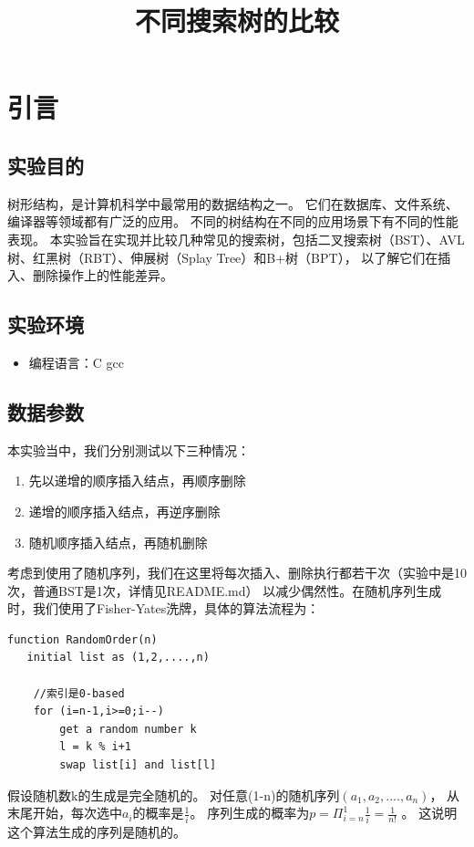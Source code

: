 \documentclass[openany]{book}
\title{不同搜索树的比较}
\begin{document}
\maketitle

\chapter{引言}
\section{实验目的}
树形结构，是计算机科学中最常用的数据结构之一。
它们在数据库、文件系统、编译器等领域都有广泛的应用。
不同的树结构在不同的应用场景下有不同的性能表现。
本实验旨在实现并比较几种常见的搜索树，包括二叉搜索树（BST）、AVL树、红黑树（RBT）、伸展树（Splay Tree）和B+树（BPT），
以了解它们在插入、删除操作上的性能差异。

\section{实验环境}

\begin{itemize}
    \item 编程语言：C gcc
\end{itemize}

\section{数据参数}
本实验当中，我们分别测试以下三种情况：
\begin{enumerate}
    \item 先以递增的顺序插入结点，再顺序删除
    \item 递增的顺序插入结点，再逆序删除
    \item 随机顺序插入结点，再随机删除
\end{enumerate}

考虑到使用了随机序列，我们在这里将每次插入、删除执行都若干次（实验中是10次，普通BST是1次，详情见README.md）
以减少偶然性。在随机序列生成时，我们使用了Fisher-Yates洗牌，具体的算法流程为：
\begin{lstlisting}
function RandomOrder(n)
   initial list as (1,2,....,n)

    //索引是0-based
    for (i=n-1,i>=0;i--)
        get a random number k
        l = k % i+1
        swap list[i] and list[l]
\end{lstlisting}

假设随机数k的生成是完全随机的。
对任意(1-n)的随机序列$(a_1,a_2,....,a_n)$，
从末尾开始，每次选中$a_i$的概率是$\frac{1}{i}$。
序列生成的概率为$p=\Pi_{i=n}^1 \frac{1}{i}=\frac{1}{n!}$ 。
这说明这个算法生成的序列是随机的。
\end{document}
